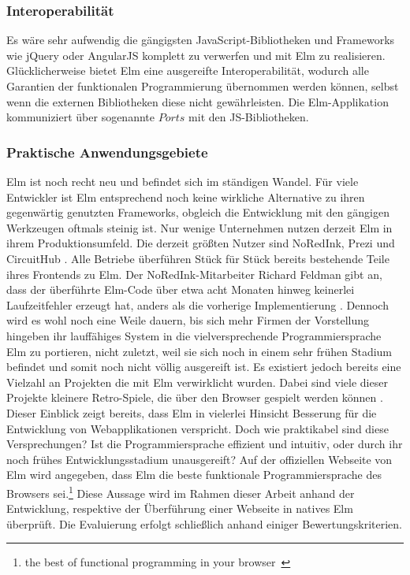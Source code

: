 \subsubsection{Interoperabilität}
\label{sec:Interoperabilität}
Es wäre sehr aufwendig die gängigsten JavaScript-Bibliotheken und Frameworks wie jQuery oder AngularJS komplett zu verwerfen und mit Elm zu realisieren. Glücklicherweise bietet Elm eine ausgereifte Interoperabilität, wodurch alle Garantien der funktionalen Programmierung übernommen werden können, selbst wenn die externen Bibliotheken diese nicht gewährleisten. Die Elm-Applikation kommuniziert über sogenannte $Ports$ mit den \ac{JS}-Bibliotheken.


\subsubsection{Praktische Anwendungsgebiete}
\label{sec:Praktische Anwendungsgebiete}
Elm ist noch recht neu und befindet sich im ständigen Wandel. Für viele Entwickler ist Elm entsprechend noch keine wirkliche Alternative zu ihren gegenwärtig genutzten Frameworks, obgleich die Entwicklung mit den gängigen Werkzeugen oftmals steinig ist. Nur wenige Unternehmen nutzen derzeit Elm in ihrem Produktionsumfeld. Die derzeit größten Nutzer sind NoRedInk, Prezi und CircuitHub \cite[Vgl.]{elm-no-runtime-errors}. Alle Betriebe überführen Stück für Stück bereits bestehende Teile ihres Frontends zu Elm. Der NoRedInk-Mitarbeiter Richard Feldman gibt an, dass der überführte Elm-Code über etwa acht Monaten hinweg keinerlei Laufzeitfehler erzeugt hat, anders als die vorherige Implementierung \cite[Vgl.]{feldman-no-errors}.
Dennoch wird es wohl noch eine Weile dauern, bis sich mehr Firmen der Vorstellung hingeben ihr lauffähiges System in die vielversprechende Programmiersprache Elm zu portieren, nicht zuletzt, weil sie sich noch in einem sehr frühen Stadium befindet und somit noch nicht völlig ausgereift ist.
Es existiert jedoch bereits eine Vielzahl an Projekten die mit Elm verwirklicht wurden. Dabei sind viele dieser Projekte kleinere Retro-Spiele, die über den Browser gespielt werden können \cite[vgl.]{builtwithelm}.
Dieser Einblick zeigt bereits, dass Elm in vielerlei Hinsicht Besserung für die Entwicklung von Webapplikationen verspricht. Doch wie praktikabel sind diese Versprechungen? Ist die Programmiersprache effizient und intuitiv, oder durch ihr noch frühes Entwicklungsstadium unausgereift?
Auf der offiziellen Webseite von Elm wird angegeben, dass Elm die beste funktionale Programmiersprache des Browsers sei.\footnote{\glqq the best of functional programming in your browser\grqq~\cite[Vgl. Eigene Übersetzung]{elm-no-runtime-errors}}
Diese Aussage wird im Rahmen dieser Arbeit anhand der Entwicklung, respektive der Überführung einer Webseite in natives Elm überprüft. Die Evaluierung erfolgt schließlich anhand einiger Bewertungskriterien.

